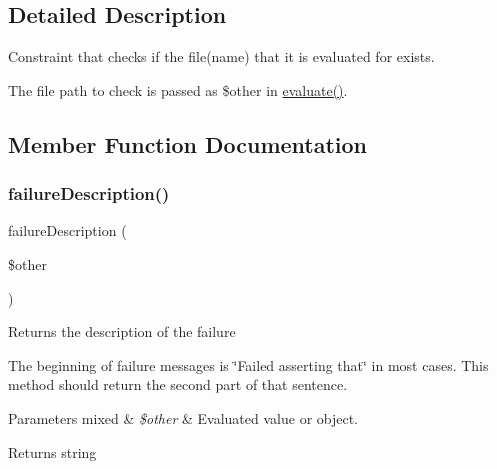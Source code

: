 \subsection{Detailed Description}
Constraint that checks if the file(name) that it is evaluated for exists.

The file path to check is passed as \$other in \mbox{\hyperlink{class_p_h_p_unit___framework___constraint_a4c184790087f7d42c3daf0d0180fe5fb}{evaluate()}}. 

\subsection{Member Function Documentation}
\mbox{\label{class_p_h_p_unit___framework___constraint___file_exists_aaabb679273bfb812df4d81c283754a59}} 
\subsubsection{\texorpdfstring{failure\+Description()}{failureDescription()}}
{\footnotesize\ttfamily failure\+Description (\begin{DoxyParamCaption}\item[{}]{\$other }\end{DoxyParamCaption})\hspace{0.3cm}{\ttfamily [protected]}}

Returns the description of the failure

The beginning of failure messages is \char`\"{}\+Failed asserting that\char`\"{} in most cases. This method should return the second part of that sentence.


\begin{DoxyParams}[1]{Parameters}
mixed & {\em \$other} & Evaluated value or object.\\
\hline
\end{DoxyParams}
\begin{DoxyReturn}{Returns}
string 
\end{DoxyReturn}
\mbox{\label{class_p_h_p_unit___framework___constraint___file_exists_a9c9c337de483bbdbb9fa249a6c7c9cc5}} 
